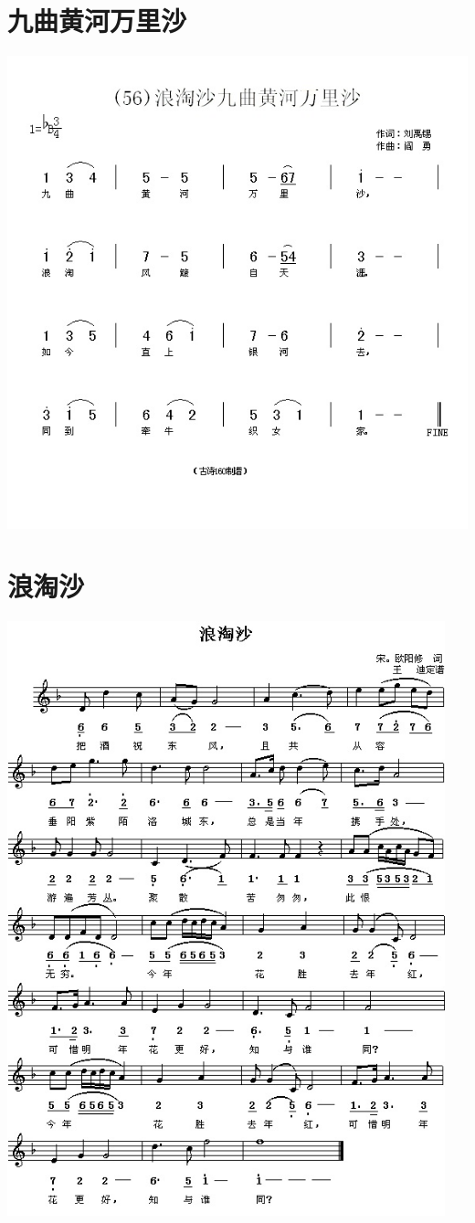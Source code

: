 \documentclass[cn,pad,twocol]{elegantbook}
\begin{document}
\section{九曲黄河万里沙}\includegraphics[width=\textwidth]{dongxiao/20200808-浪淘沙-九曲黄河万里沙-刘禹锡.jpg}
\section{浪淘沙}    \includegraphics[width=0.95\textwidth]{dongxiao/20200808-浪淘沙-欧阳修.jpg}
\end{document}
